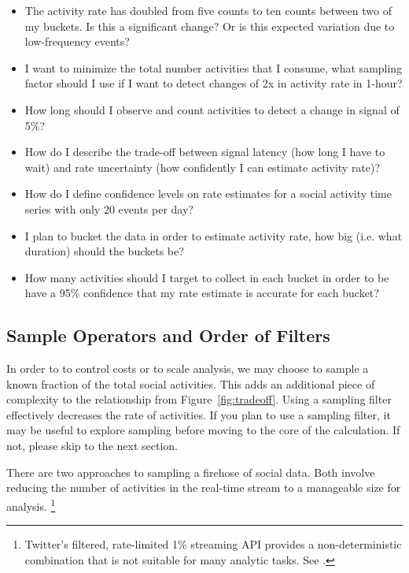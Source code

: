 \documentclass{article}
\begin{document}
\begin{itemize}
	\item The activity rate has doubled from five counts to ten counts between two of my buckets. Is this a significant change? 
	Or is this expected variation due to low-frequency events?
	\item I want to minimize the total number activities that I consume, what sampling factor should I use if I want to detect
	changes of 2x in activity rate in 1-hour?
	\item How long should I observe and count activities to detect a change in signal of 5\%?
	\item How do I describe the trade-off between signal latency (how long I have to wait) and rate uncertainty (how 
	confidently I can estimate activity rate)?
	\item How do I define confidence levels on rate estimates for a social activity time series with only 20 events per day?
	\item I plan to bucket the data in order to estimate activity rate, how big (i.e. what duration) should the buckets be? 
	\item How many activities should I target to collect in each bucket in order to be have a 95\% confidence that my 
	rate estimate is accurate for each bucket? 
\end{itemize}

\subsection{Sample Operators and Order of Filters} 

In order to to control costs or to scale analysis, we may choose to sample a known fraction of the total social activities. This adds an
additional piece of complexity to the relationship from Figure~\ref{fig:tradeoff}. Using a sampling filter effectively decreases the rate of activities. If you
plan to use a sampling filter, it may be useful to explore sampling before moving to the core of the calculation.  
If not, please skip to the next section.

There are two approaches to sampling a firehose of social data. Both involve reducing the number of activities in the 
real-time stream to a manageable size for analysis. \footnote{Twitter's filtered, rate-limited 1\% streaming API provides a 
non-deterministic combination that is not suitable for many analytic tasks.  See \cite{Morstatter:2013}.} 
\end{document}
